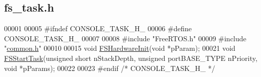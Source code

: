 \hypertarget{fs__task_8h_source}{\subsection{fs\+\_\+task.\+h}
\label{fs__task_8h_source}
}

\begin{DoxyCode}
00001 
00005 \textcolor{preprocessor}{#ifndef CONSOLE\_TASK\_H\_}
00006 \textcolor{preprocessor}{#define CONSOLE\_TASK\_H\_}
00007 
00008 \textcolor{preprocessor}{#include "FreeRTOS.h"}
00009 \textcolor{preprocessor}{#include "\hyperlink{common_8h}{common.h}"}
00010 
00015 \textcolor{keywordtype}{void} \hyperlink{fs__task_8h_ab7f1e7392ed5dbe6c58be74746987f99}{FSHardwareInit}(\textcolor{keywordtype}{void} *pParam);
00021 \textcolor{keywordtype}{void} \hyperlink{fs__task_8h_a67c975ae61cf5db912f17b454b2713c7}{FSStartTask}(\textcolor{keywordtype}{unsigned} \textcolor{keywordtype}{short} nStackDepth, \textcolor{keywordtype}{unsigned} portBASE\_TYPE nPriority, \textcolor{keywordtype}{void} *pParams);
00022 
00023 \textcolor{preprocessor}{#endif }\textcolor{comment}{/* CONSOLE\_TASK\_H\_ */}\textcolor{preprocessor}{}
\end{DoxyCode}
